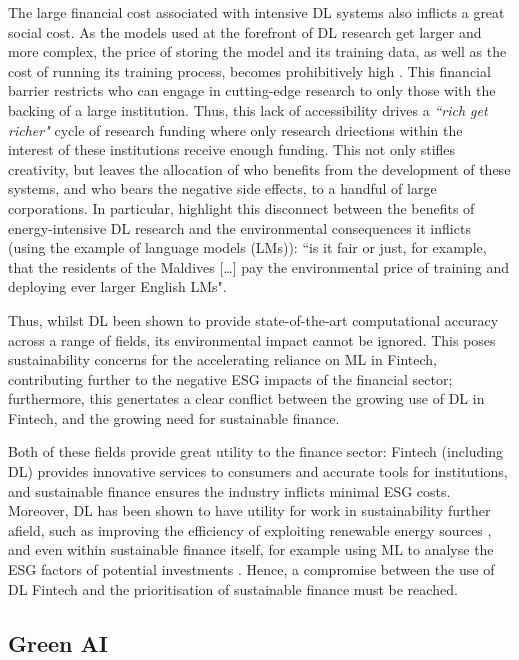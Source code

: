 \documentclass[a4paper, 11pt]{report}
\begin{document}
   The large financial cost associated with intensive DL systems also inflicts a great social cost. As the models used at the forefront of DL research get larger and more complex, the price of storing the model and its training data, as well as the cost of running its training process, becomes prohibitively high \citep{schwartz-2019}. This financial barrier restricts who can engage in cutting-edge research to only those with the backing of a large institution. Thus, this lack of accessibility drives a \emph{``rich get richer"} cycle of research funding \citep{strubell-2019} where only research driections within the interest of these institutions receive enough funding. This not only stifles creativity, but leaves the allocation of who benefits from the development of these systems, and who bears the negative side effects, to a handful of large corporations. In particular, \citet{bender-2021} highlight this disconnect between the benefits of energy-intensive DL research and the environmental consequences it inflicts (using the example of language models (LMs)): ``is it fair or just, for example, that the residents of the Maldives [\ldots] pay the environmental price of training and deploying ever larger English LMs".

    Thus, whilst DL been shown to provide state-of-the-art computational accuracy across a range of fields, its environmental impact cannot be ignored. This poses sustainability concerns for the accelerating reliance on ML in Fintech, contributing further to the negative ESG impacts of the financial sector; furthermore, this genertates a clear conflict between the growing use of DL in Fintech, and the growing need for sustainable finance.
    
    Both of these fields provide great utility to the finance sector: Fintech (including DL) provides innovative services to consumers and accurate tools for institutions, and sustainable finance ensures the industry inflicts minimal ESG costs. Moreover, DL has been shown to have utility for work in sustainability further afield, such as improving the efficiency of exploiting renewable energy sources \citep{daniel-2021}, and even within sustainable finance itself, for example using ML to analyse the ESG factors of potential investments \citep{mehra-2022}. Hence, a compromise between the use of DL Fintech and the prioritisation of sustainable finance must be reached. 


    \subsection{Green AI}
\end{document}
